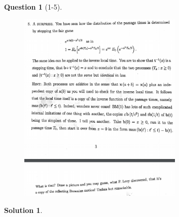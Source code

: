 \documentclass[11pt]{article}
\theoremstyle{plain}
\theoremstyle{quest}
\newtheorem*{question}{Question}
\newtheorem*{solution}{Solution}
\begin{document}
\newpage

\begin{question}[1-5]
\hfill
\begin{figure}[h!]
  \centering
    \includegraphics[width=0.7\textwidth]{limthm2-f-p5.png}
\end{figure}
\end{question}
\begin{solution} \hfill \\
\end{solution}

\newpage
\end{document}
